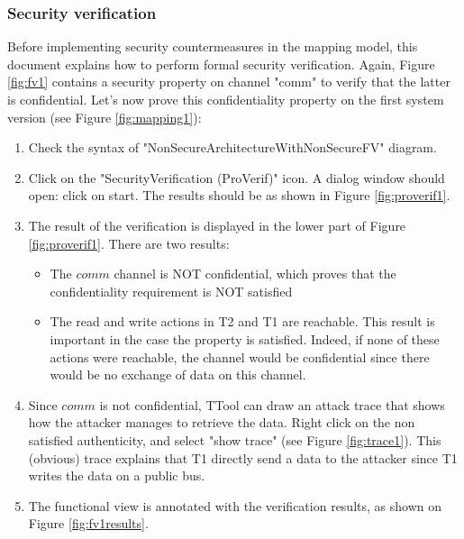 \documentclass[12pt]{article}
\begin{document}
\subsubsection{Security verification}
Before implementing security countermeasures in the mapping model, this document explains how to perform formal security
 verification. Again, Figure \ref{fig:fv1} contains a security property on channel "comm" to verify that the latter is confidential. Let's now prove this confidentiality property on the first system version (see Figure \ref{fig:mapping1}):
\begin{enumerate}
\item Check the syntax of "NonSecureArchitectureWithNonSecureFV" diagram.
\item Click on the "SecurityVerification (ProVerif)" icon. A dialog window should open: click on start. The results should be as shown in Figure \ref{fig:proverif1}.
\item The result of the verification is displayed in the lower part of Figure \ref{fig:proverif1}. There are two results:
\begin{itemize}
\item The $comm$ channel is NOT confidential, which proves that the confidentiality requirement is NOT satisfied
\item The read and write actions in T2 and T1 are reachable. This result is important in the case the property is satisfied. Indeed, if none of these actions were reachable, the channel would be confidential since there would be no exchange of data on this channel.
\end{itemize}
\item Since $comm$ is not confidential, TTool can draw an attack trace that shows how the attacker manages to retrieve the data. Right click on the non satisfied authenticity, and select "show trace" (see Figure \ref{fig:trace1}). This (obvious) trace explains that T1 directly send a data to the attacker since T1 writes the data on a public bus.
\item The functional view is annotated with the verification results, as shown on Figure \ref{fig:fv1results}.
\end{enumerate}
\end{document}
